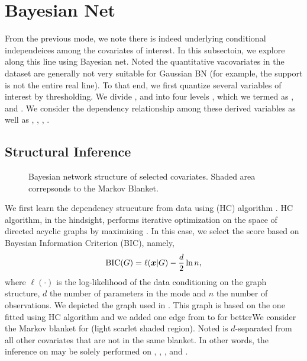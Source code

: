 \section{Bayesian Net} \label{sec:bn}

	From the previous mode, we note there is indeed underlying conditional
	independeices among the covariates of interest. In this subsectoin,
	we explore along this line using Bayesian net. Noted the quantitative vacovariates in the dataset
	are generally not very suitable for Gaussian BN (for example, the support is not the entire real line).
	To that end, we first quantize several variables of interest by thresholding. We divide , 
	and  into four levels , which we termed as ,
	 and . We consider the dependency
	relationship among these derived variables as well as , , ,
	.

	\subsection{Structural Inference}

		\begin{figure}[htpb]
			\centering
			\def\svgwidth{0.8\textwidth}
			
			\caption{Bayesian network structure of selected covariates. Shaded area correpsonds to the Markov Blanket.}
			\label{fig:bn}
		\end{figure}

		We first learn the dependency strucuture from data using  (HC) algorithm \cite{Tsa:2006:HC}.
		HC algorithm, in the hindsight, performs iterative optimization on the space of directed acyclic graphs
		by maximizing . In this case, we select the score
		based on Bayesian Information Criterion (BIC), namely,
		\begin{equation} \label{eq:bn_bic}
		\begin{aligned}
			\mathrm{BIC}(G) = \ell({\boldsymbol x} \vert G) - \frac{d}{2} \ln n,
		\end{aligned}
		\end{equation}
		where $\ell(\cdot)$ is the log-likelihood of the data conditioning on the graph
		structure, $d$ the number of parameters in the mode and $n$ the number of observations.
		We depicted the graph used in . This graph is based on the one
		fitted using HC algorithm and we added one edge from  to  for betterWe consider the Markov blanket
		for  (light scarlet shaded region). Noted  is $d$-separated
		from all other covariates that are not in the same blanket. In other words, the inference
		on  may be solely performed on , , ,
		 and .

